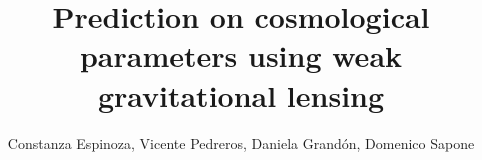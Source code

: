 
\title{\LARGE Prediction on cosmological parameters using weak gravitational lensing}
\author{Constanza Espinoza, Vicente Pedreros, Daniela Grandón, Domenico Sapone}

\newcommand{\leftfoot}{maria.espinoza.d@ug.uchile.cl}
\newcommand{\rightfoot}{vicente.pedreros@ug.uchile.cl}